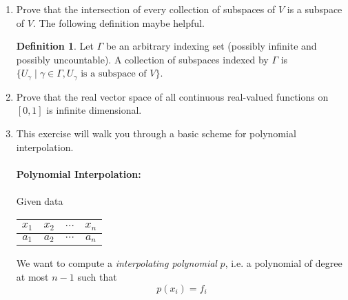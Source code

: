 \documentclass[12pt,letterpaper]{article}
\theoremstyle{plain}
\theoremstyle{definition}
\newtheorem{definition}[theorem]{Definition}
\begin{document}
\begin{enumerate}[1.]
\item Prove that the intersection of every collection of subspaces of $V$ is a subspace of $V$. The following definition maybe helpful.
\begin{definition}Let $\Gamma$ be an arbitrary indexing set (possibly infinite and possibly uncountable). A collection of subspaces indexed by $\Gamma$ is $\{U_\gamma \mid \gamma\in \Gamma, U_\gamma\text{ is a subspace of } V\}$.\\
\end{definition}
\item Prove that the real vector space of all continuous real-valued functions on $[0,1]$ is infinite dimensional. \\
\item This exercise will walk you through a basic scheme for polynomial interpolation.\\
\ \\
{\bf Polynomial Interpolation:}\\
\ \\
\noindent Given data
\begin{center}
\def\arraystretch{1.2}
\begin{tabular}{|c|c|c|c|}
\hline
$x_1$& $x_2$& $\cdots$ & $x_n$\\ \hline
$a_1$& $a_2$& $\cdots$ & $a_n$\\
\hline
\end{tabular}
\end{center}
We want to compute a \emph{interpolating polynomial} $p$, i.e. a polynomial of degree at most $n-1$ such that 
\[p(x_i)=f_i\]


\end{enumerate}
\end{document}
